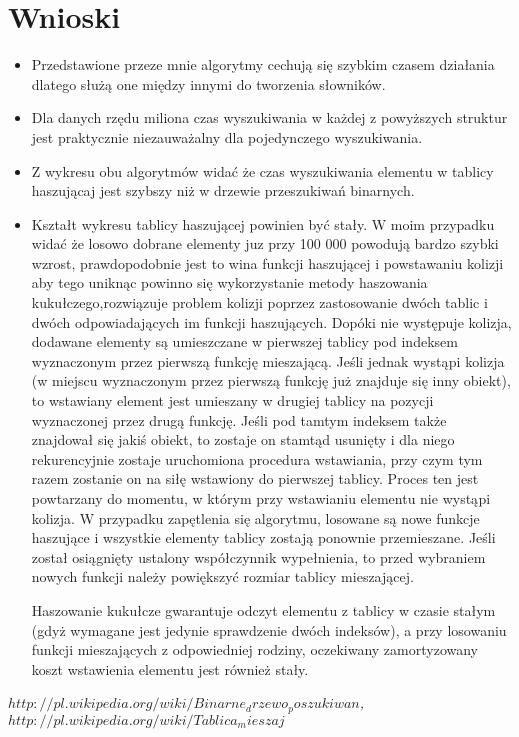 \documentclass[11pt]{article}
\begin{document}
\section{Wnioski}
\begin{itemize}
\item Przedstawione przeze mnie algorytmy cechują się szybkim czasem działania dlatego służą one między innymi do tworzenia słowników.
\item Dla danych rzędu miliona czas wyszukiwania w każdej z powyższych struktur jest praktycznie niezauważalny dla pojedynczego wyszukiwania.
\item Z wykresu obu algorytmów widać że czas wyszukiwania elementu w tablicy haszującaj jest szybszy niż w drzewie przeszukiwań binarnych.
\item Kształt wykresu tablicy haszującej powinien być stały. W moim przypadku widać że losowo dobrane elementy juz przy 100 000 powodują bardzo  szybki wzrost, prawdopodobnie jest to wina funkcji haszującej i powstawaniu kolizji aby tego uniknąc powinno się wykorzystanie metody haszowania kukułczego,rozwiązuje problem kolizji poprzez zastosowanie dwóch tablic i dwóch odpowiadających im funkcji haszujących. Dopóki nie występuje kolizja, dodawane elementy są umieszczane w pierwszej tablicy pod indeksem wyznaczonym przez pierwszą funkcję mieszającą. Jeśli jednak wystąpi kolizja (w miejscu wyznaczonym przez pierwszą funkcję już znajduje się inny obiekt), to wstawiany element jest umieszany w drugiej tablicy na pozycji wyznaczonej przez drugą funkcję. Jeśli pod tamtym indeksem także znajdował się jakiś obiekt, to zostaje on stamtąd usunięty i dla niego rekurencyjnie zostaje uruchomiona procedura wstawiania, przy czym tym razem zostanie on na siłę wstawiony do pierwszej tablicy. Proces ten jest powtarzany do momentu, w którym przy wstawianiu elementu nie wystąpi kolizja. W przypadku zapętlenia się algorytmu, losowane są nowe funkcje haszujące i wszystkie elementy tablicy zostają ponownie przemieszane. Jeśli został osiągnięty ustalony współczynnik wypełnienia, to przed wybraniem nowych funkcji należy powiększyć rozmiar tablicy mieszającej.

Haszowanie kukułcze gwarantuje odczyt elementu z tablicy w czasie stałym (gdyż wymagane jest jedynie sprawdzenie dwóch indeksów), a przy losowaniu funkcji mieszających z odpowiedniej rodziny, oczekiwany zamortyzowany koszt wstawienia elementu jest również stały.
\end{itemize} 

\begin{thebibliography}{99}
\emph{$ http://pl.wikipedia.org/wiki/Binarne_drzewo_poszukiwan$,}
\emph{$http://pl.wikipedia.org/wiki/Tablica_mieszaj$}
\end{thebibliography}
\end{document}
